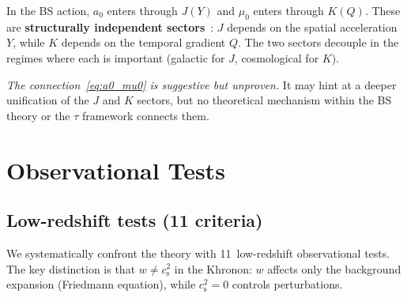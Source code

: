 \documentclass[prd,twocolumn,superscriptaddress,longbibliography,floatfix]{revtex4-2}
\newcommand{\tauasym}{\tau}
\newcommand{\cs}{c_{\mathrm{s}}}
\begin{document}
In the BS action, $a_0$ enters through $J(Y)$ and $\mu_0$
enters through $K(Q)$.  These are \textbf{structurally
independent sectors}~\cite{BS2024}: $J$ depends on the spatial
acceleration $Y$, while $K$ depends on the temporal gradient $Q$.
The two sectors decouple in the regimes where each is important
(galactic for $J$, cosmological for $K$).

\emph{The connection~\eqref{eq:a0_mu0} is suggestive but
unproven.}  It may hint at a deeper unification of the $J$
and $K$ sectors, but no theoretical mechanism within the BS
theory or the $\tauasym$ framework connects them.


\section{Observational Tests}
\label{sec:tests}

\subsection{Low-redshift tests (11 criteria)}

We systematically confront the theory with 11~low-redshift
observational tests.  The key distinction is that
$w \neq \cs^2$ in the Khronon: $w$ affects
only the background expansion (Friedmann equation), while
$\cs^2 = 0$ controls perturbations.
\end{document}
